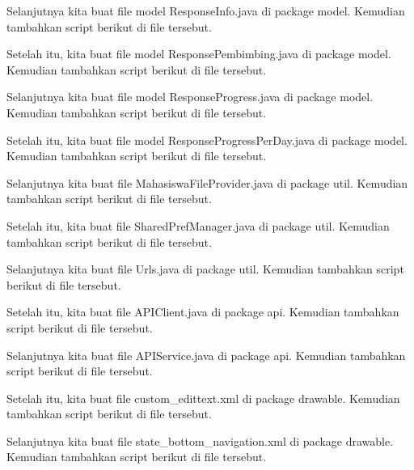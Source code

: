 Selanjutnya kita buat file model ResponseInfo.java di package model. Kemudian tambahkan script berikut di file tersebut.


Setelah itu, kita buat file model ResponsePembimbing.java di package model. Kemudian tambahkan script berikut di file tersebut.


Selanjutnya kita buat file model ResponseProgress.java di package model. Kemudian tambahkan script berikut di file tersebut.


Setelah itu, kita buat file model ResponseProgressPerDay.java di package model. Kemudian tambahkan script berikut di file tersebut.


Selanjutnya kita buat file MahasiswaFileProvider.java di package util. Kemudian tambahkan script berikut di file tersebut.


Setelah itu, kita buat file SharedPrefManager.java di package util. Kemudian tambahkan script berikut di file tersebut.


Selanjutnya kita buat file Urls.java di package util. Kemudian tambahkan script berikut di file tersebut.


Setelah itu, kita buat file APIClient.java di package api. Kemudian tambahkan script berikut di file tersebut.


Selanjutnya kita buat file APIService.java di package api. Kemudian tambahkan script berikut di file tersebut.


Setelah itu, kita buat file custom\_edittext.xml di package drawable. Kemudian tambahkan script berikut di file tersebut.


Selanjutnya kita buat file state\_bottom\_navigation.xml di package drawable. Kemudian tambahkan script berikut di file tersebut.


